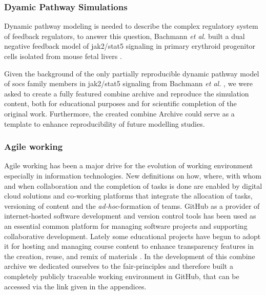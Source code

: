 \subsubsection*{Dyamic Pathway Simulations}
Dynamic pathway modeling is needed to describe the complex regulatory system of feedback regulators, to answer this question, Bachmann \textit{et al.} built a dual negative feedback model of \ac{jak}2/\ac{stat}5 signaling in primary erythroid progenitor cells isolated from mouse fetal livers \cite{bachmannmodel}.

Given the background of the only partially reproducible dynamic pathway model of \ac{socs} family members in \ac{jak}2/\ac{stat}5 signaling from Bachmann \textit{et al.} \cite{bachmannmodel}, we were asked to create a fully featured \ac{combine} archive and reproduce the simulation content, both for educational purposes and for scientific completion of the original work. Furthermore, the created \ac{combine} Archive could serve as a template to enhance reproducibility of future modelling studies.

\subsubsection*{Agile working}
Agile working has been a major drive for the evolution of working environment especially in information technologies. New definitions on how, where, with whom and when collaboration and the completion of tasks is done are enabled by digital cloud solutions and co-working platforms that integrate the allocation of tasks, versioning of content and the \textit{ad-hoc}-formation of teams. GitHub as a provider of internet-hosted software development and version control tools has been used as an essential common platform for managing software projects and supporting collaborative development. Lately some educational projects have begun to adopt it for hosting and managing course content to enhance transparency features in the creation, reuse, and remix of materials \cite{github, Knegendorf.}. In the development of this \ac{combine} archive we dedicated ourselves to the \acs{fair}-principles and therefore built a completely publicly traceable working environment in GitHub, that can be accessed via the link given in the appendices.


